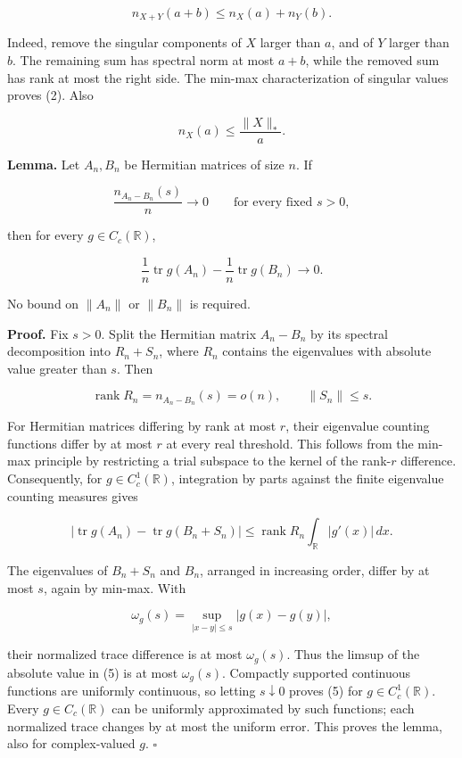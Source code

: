 \documentclass[10pt,a4paper]{article}
\begin{document}
\[n_{X+Y}(a+b)\le n_X(a)+n_Y(b).\tag{2}\]

Indeed, remove the singular components of \(X\) larger than \(a\), and
of \(Y\) larger than \(b\). The remaining sum has spectral norm at most
\(a+b\), while the removed sum has rank at most the right side. The
min-max characterization of singular values proves (2). Also

\[n_X(a)\le\frac{\|X\|_*}{a}.\tag{3}\]

\textbf{Lemma.} Let \(A_n,B_n\) be Hermitian matrices of size \(n\). If

\[\frac{n_{A_n-B_n}(s)}n\longrightarrow0\qquad\text{for every fixed }s>0,\tag{4}\]

then for every \(g\in C_c(\mathbb R)\),

\[\frac1n\operatorname{tr}g(A_n)-\frac1n\operatorname{tr}g(B_n)\longrightarrow0.\tag{5}\]

No bound on \(\|A_n\|\) or \(\|B_n\|\) is required.

\textbf{Proof.} Fix \(s>0\). Split the Hermitian matrix \(A_n-B_n\) by
its spectral decomposition into \(R_n+S_n\), where \(R_n\) contains the
eigenvalues with absolute value greater than \(s\). Then

\[\operatorname{rank}R_n=n_{A_n-B_n}(s)=o(n),\qquad\|S_n\|\le s.\]

For Hermitian matrices differing by rank at most \(r\), their eigenvalue
counting functions differ by at most \(r\) at every real threshold. This
follows from the min-max principle by restricting a trial subspace to
the kernel of the rank-\(r\) difference. Consequently, for
\(g\in C_c^1(\mathbb R)\), integration by parts against the finite
eigenvalue counting measures gives

\[\left|\operatorname{tr}g(A_n)-\operatorname{tr}g(B_n+S_n)\right|
\le \operatorname{rank}R_n\int_{\mathbb R}|g'(x)|\,dx.\tag{6}\]

The eigenvalues of \(B_n+S_n\) and \(B_n\), arranged in increasing
order, differ by at most \(s\), again by min-max. With

\[\omega_g(s)=\sup_{|x-y|\le s}|g(x)-g(y)|,\]

their normalized trace difference is at most \(\omega_g(s)\). Thus the
limsup of the absolute value in (5) is at most \(\omega_g(s)\).
Compactly supported continuous functions are uniformly continuous, so
letting \(s\downarrow0\) proves (5) for \(g\in C_c^1(\mathbb R)\). Every
\(g\in C_c(\mathbb R)\) can be uniformly approximated by such functions;
each normalized trace changes by at most the uniform error. This proves
the lemma, also for complex-valued \(g\). \(\square\)
\end{document}
